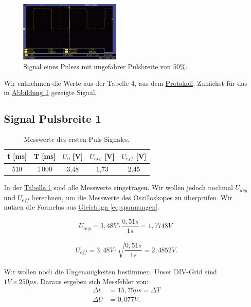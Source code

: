 \begin{figure} [h!]
    \centering
        \includegraphics[width=0.45\textwidth]{img/25/Puls3/Puls50.pdf}
    \caption{Signal eines Pulses mit ungefährer Pulsbreite von 50\%.}
    \label{fig:sp_50}
\end{figure}
Wir entnehmen die Werte aus der Tabelle 4, aus dem \hyperref[Protokoll]{Protokoll}. Zunächst für das in \hyperref[fig:sp_50]{Abbildung \ref*{fig:sp_50}} gezeigte Signal.

\subsection*{Signal Pulsbreite 1}
\begin{table}[h!]
    \centering
    \begin{tabular}{c | c | c | c | c}
        \toprule
        t [ms] & T [ms] & $U_0$ [V] & $U_{avg}$ [V] & $U_{eff}$ [V] \\
        \hline
        510 & 1\,000  & 3,48 & 1,73 & 2,45 \\
        \bottomrule
    \end{tabular}
    \caption{Messwerte des ersten Puls Signales.}
    \label{tab:sp_1}
\end{table}

In der \hyperref[tab:sp_1]{Tabelle \ref*{tab:sp_1}} sind alle Messwerte eingetragen. Wir wollen jedoch nochmal $U_{avg}$ und $U_{eff}$ berechnen, um die Messwerte des Oszilloskopes zu überprüfen. Wir nutzen die Formelns aus \hyperref[eq:spannungen]{Gleichugn \ref*{eq:spannungen}}.

\begin{equation}
    \underline{
        U_{avg} = 3,48V \cdot \frac{0,51s}{1s} = 1,7748V
    }.
\end{equation}

\begin{equation}
    \underline{
        U_{eff} = 3,48V \cdot \sqrt{\frac{0,51s}{1s}} = 2,4852V
    }.
\end{equation}

Wir wollen noch die Ungenauigkeiten bestimmen. Unser DIV-Grid sind $1V \times 250 \mu s$. Daraus ergeben sich Messfehler von:
\begin{align}
    \Delta t &= 15,75 \mu s = \Delta T \\
    \Delta U &= 0,077 V.
    \label{eq:f_3}
\end{align} 

